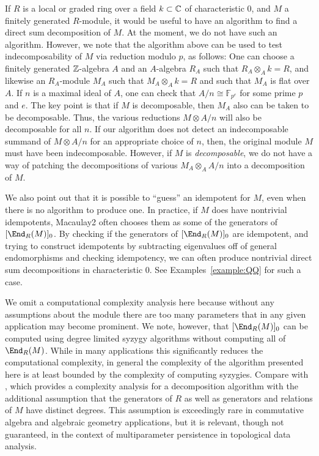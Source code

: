\documentclass[12pt]{article}
\numberwithin{equation}{section}
\theoremstyle{theorem}
\numberwithin{thm}{section}
\theoremstyle{definition}
\begin{document}
\begin{rem}
If $R$ is a local or graded ring over a field $k\subset \mathbb C$ of characteristic 0, and $M$ a finitely generated $R$-module, it would be useful to have an algorithm to find a direct sum decomposition of $M$.
At the moment, we do not have such an algorithm.
However, we note that the algorithm above can be used to test indecomposability of $M$ via reduction modulo $p$, as follows:
One can choose a finitely generated $\mathbb Z$-algebra $A$ and an $A$-algebra $R_A$ such that $R_A\otimes _A k=R$, and likewise an $R_A$-module $M_A$ such that $M_A\otimes _A k = R$ and such that $M_A$ is flat over $A$. If $n$ is a maximal ideal of $A$, one can check that $A/n \cong \mathbb F_{p^e}$ for some prime $p$ and $e$.
The key point is that if $M$ is decomposable, then $M_A$ also can be taken to be decomposable. Thus, the various reductions  $M\otimes A/n$ will also be decomposable for all $n$.
If our algorithm does not detect an indecomposable summand of $M\otimes A/n$ for an appropriate choice of $n$, then, the original module $M$ must have been indecomposable.
However, if $M$ is \emph{decomposable}, we do not have a way of patching the decompositions of various $M_A\otimes_A A/n$ into a decomposition of $M$.

We also point out that it is possible to ``guess'' an idempotent for $M$, even when there is no algorithm to produce one. In practice, if $M$ does have nontrivial idempotents, Macaulay2 often chooses them as some of the generators of $[\End_R(M)]_0$. By checking if the generators of $[\End_R(M)]_0$ are idempotent, and trying to construct idempotents by subtracting eigenvalues off of general endomorphisms and checking idempotency, we can often produce nontrivial direct sum decompositions in characteristic 0.
See Examples~\ref{example:QQ} for such a case.
\end{rem}

\begin{rem}
  We omit a computational complexity analysis here because without any assumptions about the module there are too many parameters that in any given application may become prominent. We note, however, that $[\End_R(M)]_0$ can be computed using degree limited syzygy algorithms without computing all of $\End_R(M)$. While in many applications this significantly reduces the computational complexity, in general the complexity of the algorithm presented here is at least bounded by the complexity of computing syzygies. Compare with \cite{DX22}, which provides a complexity analysis for a decomposition algorithm with the additional assumption that the generators of $R$ as well as generators and relations of $M$ have distinct degrees. This assumption is exceedingly rare in commutative algebra and algebraic geometry applications, but it is relevant, though not guaranteed, in the context of multiparameter persistence in topological data analysis.
\end{rem}
\end{document}
